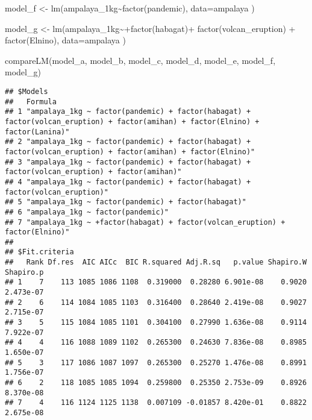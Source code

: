 \documentclass[
]{article}
\newenvironment{Shaded}{\begin{snugshade}}{\end{snugshade}}
\newcommand{\AttributeTok}[1]{\textcolor[rgb]{0.77,0.63,0.00}{#1}}
\newcommand{\FunctionTok}[1]{\textcolor[rgb]{0.00,0.00,0.00}{#1}}
\newcommand{\NormalTok}[1]{#1}
\newcommand{\OtherTok}[1]{\textcolor[rgb]{0.56,0.35,0.01}{#1}}
\newcommand{\SpecialCharTok}[1]{\textcolor[rgb]{0.00,0.00,0.00}{#1}}
\begin{document}
\begin{Shaded}
\begin{Highlighting}[]
\NormalTok{model\_f }\OtherTok{\textless{}{-}} \FunctionTok{lm}\NormalTok{(ampalaya\_1kg}\SpecialCharTok{\textasciitilde{}}\FunctionTok{factor}\NormalTok{(pandemic), }
              \AttributeTok{data=}\NormalTok{ampalaya )}

\NormalTok{model\_g }\OtherTok{\textless{}{-}} \FunctionTok{lm}\NormalTok{(ampalaya\_1kg}\SpecialCharTok{\textasciitilde{}+}\FunctionTok{factor}\NormalTok{(habagat)}\SpecialCharTok{+}
                \FunctionTok{factor}\NormalTok{(volcan\_eruption) }\SpecialCharTok{+} \FunctionTok{factor}\NormalTok{(Elnino), }
              \AttributeTok{data=}\NormalTok{ampalaya )}


\FunctionTok{compareLM}\NormalTok{(model\_a, model\_b, model\_c, model\_d, model\_e, model\_f, model\_g)}
\end{Highlighting}
\end{Shaded}

\begin{verbatim}
## $Models
##   Formula                                                                                                                         
## 1 "ampalaya_1kg ~ factor(pandemic) + factor(habagat) + factor(volcan_eruption) + factor(amihan) + factor(Elnino) + factor(Lanina)"
## 2 "ampalaya_1kg ~ factor(pandemic) + factor(habagat) + factor(volcan_eruption) + factor(amihan) + factor(Elnino)"                 
## 3 "ampalaya_1kg ~ factor(pandemic) + factor(habagat) + factor(volcan_eruption) + factor(amihan)"                                  
## 4 "ampalaya_1kg ~ factor(pandemic) + factor(habagat) + factor(volcan_eruption)"                                                   
## 5 "ampalaya_1kg ~ factor(pandemic) + factor(habagat)"                                                                             
## 6 "ampalaya_1kg ~ factor(pandemic)"                                                                                               
## 7 "ampalaya_1kg ~ +factor(habagat) + factor(volcan_eruption) + factor(Elnino)"                                                    
## 
## $Fit.criteria
##   Rank Df.res  AIC AICc  BIC R.squared Adj.R.sq   p.value Shapiro.W Shapiro.p
## 1    7    113 1085 1086 1108  0.319000  0.28280 6.901e-08    0.9020 2.473e-07
## 2    6    114 1084 1085 1103  0.316400  0.28640 2.419e-08    0.9027 2.715e-07
## 3    5    115 1084 1085 1101  0.304100  0.27990 1.636e-08    0.9114 7.922e-07
## 4    4    116 1088 1089 1102  0.265300  0.24630 7.836e-08    0.8985 1.650e-07
## 5    3    117 1086 1087 1097  0.265300  0.25270 1.476e-08    0.8991 1.756e-07
## 6    2    118 1085 1085 1094  0.259800  0.25350 2.753e-09    0.8926 8.370e-08
## 7    4    116 1124 1125 1138  0.007109 -0.01857 8.420e-01    0.8822 2.675e-08
\end{verbatim}
\end{document}
